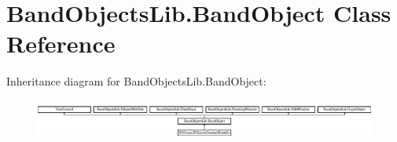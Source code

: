 \hypertarget{class_band_objects_lib_1_1_band_object}{\section{Band\+Objects\+Lib.\+Band\+Object Class Reference}
\label{class_band_objects_lib_1_1_band_object}
}
Inheritance diagram for Band\+Objects\+Lib.\+Band\+Object\+:\begin{figure}[H]
\begin{center}
\leavevmode
\includegraphics[height=1.320755cm]{class_band_objects_lib_1_1_band_object}
\end{center}
\end{figure}
